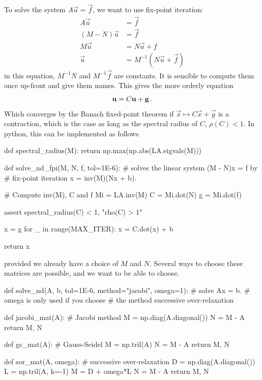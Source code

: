 \documentclass[12pt]{article}
\begin{document}
\begin{multicols}{2}
    To solve the system $A\vec u = \vec f$, we want to use
    fix-point iteration:
    \begin{align*}
        A \vec u &= \vec f \\
        (M - N) \vec u &= \vec f \\
        M \vec u &= N \vec u + f \\
        \vec u &= M^{-1} (N \vec u + \vec f)
    \end{align*}
    in this equation, $M^{-1}N$ and $M^{-1}\vec f$ are constants.
    It is sensible to compute them once up-front and give them
    names.
    This gives the more orderly equation
    \[
        \vec u = C\vec u + \vec g \,\text.
    \]
    Which converges by the Banach fixed-point theorem if
    $\vec x \mapsto C\vec x + \vec g$ is a contraction,
    which is the case as long as the spectral radius of
    $C$, $\rho(C) < 1$.
    In python, this can be implemented as follows
    \begin{python}[
        caption={N-dimensional solver.}
    ]
def spectral_radius(M):
    return np.max(np.abs(LA.eigvals(M)))

def solve_nd_fpi(M, N, f, tol=1E-6):
    # solves the linear system (M - N)x = f by
    # fix-point iteration x = inv(M)(Nx + b).

    # Compute inv(M), C and f
    Mi = LA.inv(M)
    C = Mi.dot(N)
    g = Mi.dot(f)

    assert spectral_radius(C) < 1, "rho(C) > 1"

    x = g
    for _ in range(MAX_ITER):
        x = C.dot(x) + b

    return x
    \end{python}
    provided we already have a choice of $M$ and $N$.
    Several ways to choose these matrices are possible,
    and we want to be able to choose.
    \begin{python}[
        caption={Argument-``parser'' and choice of $M$, $N$.}
    ]
def solve_nd(A, b, tol=1E-6,
        method="jacobi", omega=1):
    # solve Ax = b.
    # omega is only used if you choose
    # the method successive over-relaxation

    def jacobi_mat(A):
        # Jacobi method
        M = np.diag(A.diagonal())
        N = M - A
        return M, N

    def gs_mat(A):
        # Gauss-Seidel
        M = np.tril(A)
        N = M - A
        return M, N

    def sor_mat(A, omega):
        # successive over-relaxation
        D = np.diag(A.diagonal())
        L = np.tril(A, k=-1)
        M = D + omega*L
        N = M - A
        return M, N


\end{python}
\end{multicols}
\end{document}
